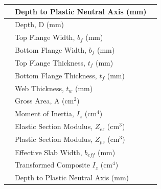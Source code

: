 \documentclass[12pt,a4paper]{report}
\numberwithin{table}{chapter}
\numberwithin{figure}{chapter}
\begin{document}
\begin{longtable}{|C{2.5cm}|L{8.0cm}|>{\centering\arraybackslash}p{5.0cm}|}
 & \textnormal{Depth to Plastic Neutral Axis (mm)} &  \\[6pt]
\hline
{} & \textnormal{Depth, D (mm)} &  \\[6pt]
 & \textnormal{Top Flange Width, $b_f$ (mm)} &  \\[6pt]
 & \textnormal{Bottom Flange Width, $b_f$ (mm)} &  \\[6pt]
 & \textnormal{Top Flange Thickness, $t_f$ (mm)} &  \\[6pt]
 & \textnormal{Bottom Flange Thickness, $t_f$ (mm)} &  \\[6pt]
 & \textnormal{Web Thickness, $t_w$ (mm)} &  \\[6pt]
 & \textnormal{Gross Area, A (cm$^2$)} &  \\[6pt]
 & \textnormal{Moment of Inertia, $I_z$ (cm$^4$)} &  \\[6pt]
 & \textnormal{Elastic Section Modulus, $Z_{ez}$ (cm$^3$)} &  \\[6pt]
 & \textnormal{Plastic Section Modulus, $Z_{pz}$ (cm$^3$)} &  \\[6pt]
 & \textnormal{Effective Slab Width, $b_{eff}$ (mm)} &  \\[6pt]
 & \textnormal{Transformed Composite $I_z$ (cm$^4$)} &  \\[6pt]
 & \textnormal{Depth to Plastic Neutral Axis (mm)} &  \\[6pt]
\hline
\end{longtable}
\end{document}

